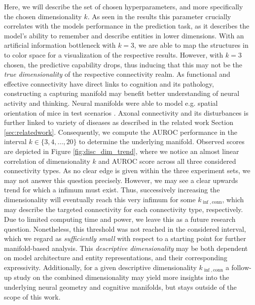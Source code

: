 \documentclass[]{article}
\renewcommand{\cite}{\citep}
\begin{document}
Here, we will describe the set of chosen hyperparameters, and more specifically the chosen dimensionality $k$. As seen in the results this parameter crucially correlates with the models performance in the prediction task, as it describes the model's ability to remember and describe entities in lower dimensions. With an artificial information bottleneck with $k=3$, we are able to map the structures in to color space for a visualization of the respective results. 
However, with $k=3$ chosen, the predictive capability drops, thus inducing that this may not be the \textit{true dimensionality} of the respective connectivity realm. As functional and effective connectivity have direct links to cognition and its pathology, constructing a capturing manifold may benefit better understanding of neural activity and thinking. Neural manifolds were able to model e.g. spatial orientation of mice in test scenarios \cite{nieh2021geometry, stringer2019high}. Axonal connectivity and its disturbances is further linked to variety of diseases as described in the related work Section \ref{sec:relatedwork}. 
Consequently, we compute the AUROC performance in the interval $k\in \{3,4,\dots,20\}$ to determine the underlying manifold. Observed scores are depicted in Figure \ref{fig:disc_dim_trend}, where we notice an almost linear correlation of dimensionality $k$ and AUROC score across all three considered connectivity types. As no clear edge is given within the three experiment sets, we may not answer this question precisely. However, we may see a clear upwards trend for which a infimum must exist. Thus, successively increasing the dimensionality will eventually reach this very infimum for some $k_{\inf, \text{conn}}$, which may describe the targeted connectivity for each connectivity type, respectively. Due to limited computing time and power, we leave this as a future research question. Nonetheless, this threshold was not reached in the considered interval, which we regard as \textit{sufficiently small} with respect to a starting point for further manifold-based analysis. This \textit{descriptive dimensionality} may be both dependent on model architecture and entity representations, and their corresponding expressivity. Additionally, for a given descriptive dimensionality $k_{\inf, \text{conn}}$ a follow-up study on the combined dimensionality may yield more insights into the underlying neural geometry and cognitive manifolds, but stays outside of the scope of this work. \\
\end{document}
